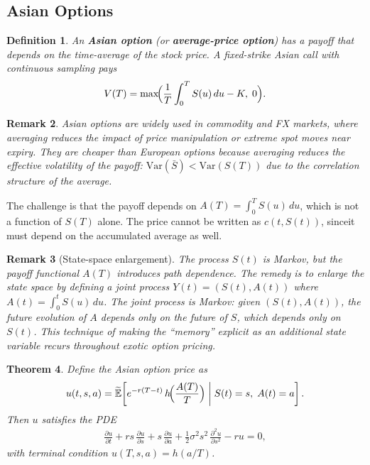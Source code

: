 \documentclass{report}
\theoremstyle{spacedplain}
\newtheorem{theorem}{Theorem}[section]
\theoremstyle{spaceddefinition}
\newtheorem{definition}[theorem]{Definition}
\theoremstyle{spacedremark}
\newtheorem{remark}[theorem]{Remark}
\begin{document}
\subsection{Asian Options}

\begin{definition}
An \textbf{Asian option} (or \textbf{average-price option}) has a payoff that depends on the time-average of the stock price. A fixed-strike Asian call with continuous sampling pays
\begin{align}
    V(T) = \max\!\Bigl(\frac{1}{T}\int_0^T S(u)\,du - K,\;0\Bigr).
\end{align}
\end{definition}

\begin{remark}
Asian options are widely used in commodity and FX markets, where averaging reduces the impact of price manipulation or extreme spot moves near expiry. They are cheaper than European options because averaging reduces the effective volatility of the payoff: $\text{Var}(\bar{S}) < \text{Var}(S(T))$ due to the correlation structure of the average.
\end{remark}

The challenge is that the payoff depends on $A(T) = \int_0^T S(u)\,du$, which is not a function of $S(T)$ alone. The price cannot be written as $c(t, S(t))$, sinceit must depend on the accumulated average as well.

\begin{remark}[State-space enlargement]
The process $S(t)$ is Markov, but the payoff functional $A(T)$ introduces path dependence. The remedy is to enlarge the state space by defining a joint process $Y(t) = (S(t), A(t))$ where $A(t) = \int_0^t S(u)\,du$. The joint process is Markov: given $(S(t), A(t))$, the future evolution of $A$ depends only on the future of $S$, which depends only on $S(t)$. This technique of making the ``memory'' explicit as an additional state variable recurs throughout exotic option pricing.
\end{remark}

\begin{theorem}
Define the Asian option price as
\begin{align}
    u(t,s,a) = \widetilde{\mathbb{E}}\!\left[e^{-r(T-t)}\,h\!\Bigl(\frac{A(T)}{T}\Bigr)\;\middle|\;S(t) = s,\;A(t) = a\right].
\end{align}
Then $u$ satisfies the PDE
\begin{align}
    \frac{\partial u}{\partial t} + rs\,\frac{\partial u}{\partial s} + s\,\frac{\partial u}{\partial a} + \frac{1}{2}\sigma^2 s^2\,\frac{\partial^2 u}{\partial s^2} - ru = 0,
\end{align}
with terminal condition $u(T,s,a) = h(a/T)$.
\end{theorem}
\end{document}
